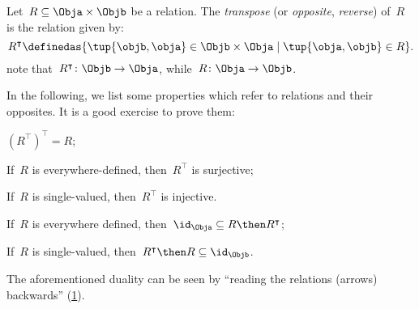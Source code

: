 \begin{definition}
  \label{def:relation-transpose}
  Let~$R\subseteq \Obja\times \Objb$ be a relation. The \emph{transpose} (or \emph{opposite}, \emph{reverse}) of~$R$ is the relation given by:
  \begin{equation*}
    R^\intercal \definedas \{\tup{\objb,\obja}\in \Objb\times \Obja \mid \tup{\obja,\objb}\in R \}.
  \end{equation*}
  note that~$R^\intercal\colon \Objb\to \Obja$, while~$R\colon \Obja\to \Objb$.
\end{definition}
\begin{remark}
  In the following, we list some properties which refer to relations and their opposites. It is a good exercise to prove them:
  \begin{compactitem}
    \item $\left( R^\intercal\right)^\intercal =R$;
    \item If~$R$ is everywhere-defined, then~$R^\intercal$ is surjective;
    \item If~$R$ is single-valued, then~$R^\intercal$ is injective.
    \item If~$R$ is everywhere defined, then~$\id_\Obja\subseteq R\then R^\intercal$;
    \item If~$R$ is single-valued, then~$R^\intercal\then R\subseteq \id_\Objb$.
  \end{compactitem}
\end{remark}

\begin{remark}
  The aforementioned duality can be seen by ``reading the relations (arrows) backwards'' (\cref{fig:rel_transpose}).
\end{remark}

\begin{figure}[h!]
  \centering
  \caption{\label{fig:rel_transpose}}
\end{figure}
